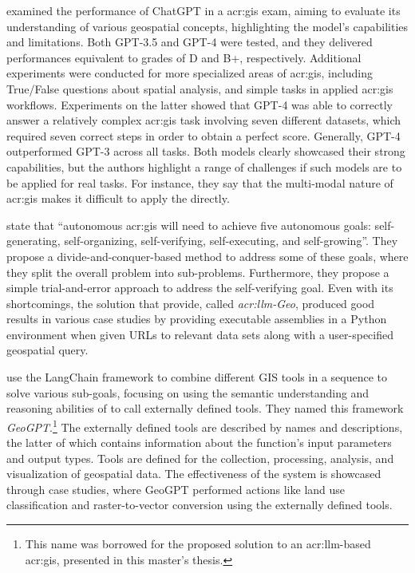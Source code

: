 \cite{mooneyUnderstandingGeospatialSkills2023} examined the performance of ChatGPT in a \acrshort{acr:gis} exam, aiming to evaluate its understanding of various geospatial concepts, highlighting the model's capabilities and limitations. Both GPT-3.5 and GPT-4 were tested, and they delivered performances equivalent to grades of D and B+, respectively. Additional experiments were conducted for more specialized areas of \acrshort{acr:gis}, including True/False questions about spatial analysis, and simple tasks in applied \acrshort{acr:gis} workflows. Experiments on the latter showed that GPT-4 was able to correctly answer a relatively complex \acrshort{acr:gis} task involving seven different datasets, which required seven correct steps in order to obtain a perfect score. Generally, GPT-4 outperformed GPT-3 across all tasks. Both models clearly showcased their strong capabilities, but the authors highlight a range of challenges if such models are to be applied for real tasks. For instance, they say that the multi-modal nature of \acrshort{acr:gis} makes it difficult to apply the  directly.

\cite{liAutonomousGISNextgeneration2023} state that \enquote{autonomous \acrshort{acr:gis} will need to achieve five autonomous goals: self-generating, self-organizing, self-verifying, self-executing, and self-growing}. They propose a divide-and-conquer-based method to address some of these goals, where they split the overall problem into sub-problems. Furthermore, they propose a simple trial-and-error approach to address the self-verifying goal. Even with its shortcomings, the solution that \citeauthor{liAutonomousGISNextgeneration2023} provide, called \textit{\acrshort{acr:llm}-Geo}, produced good results in various case studies by providing executable assemblies in a Python environment when given URLs to relevant data sets along with a user-specified geospatial query.

\cite{zhangGeoGPTUnderstandingProcessing2023} use the LangChain framework to combine different GIS tools in a sequence to solve various sub-goals, focusing on using the semantic understanding and reasoning abilities of  to call externally defined tools. They named this framework \textit{GeoGPT}.\footnote{This name was borrowed for the proposed solution to an \acrshort{acr:llm}-based \acrshort{acr:gis}, presented in this master's thesis.} The externally defined tools are described by names and descriptions, the latter of which contains information about the function's input parameters and output types. Tools are defined for the collection, processing, analysis, and visualization of geospatial data. The effectiveness of the system is showcased through case studies, where GeoGPT performed actions like land use classification and raster-to-vector conversion using the externally defined tools.


